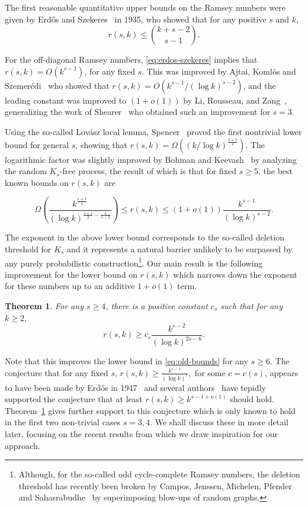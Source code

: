 \documentclass{article}
\theoremstyle{plain}
\newtheorem{theorem}{Theorem}[section]
\theoremstyle{definition}
\begin{document}
The first reasonable quantitative upper bounds on the Ramsey numbers were given by Erd\H{o}s and Szekeres~\cite{erdos-szekeres} in 1935, who showed that for any positive $s$ and $k$, 
\begin{equation} \label{eq:erdos-szekeres}
    r(s, k) \le \binom{k+s-2}{s-1}.
\end{equation}

For the off-diagonal Ramsey numbers, \eqref{eq:erdos-szekeres} implies that $r(s, k) = O(k^{s-1})$, for any fixed $s$. This was improved by Ajtai, Koml\'{o}s and Szemer\'{e}di~\cite{ajtai} who showed that $r(s, k) = O(k^{s-1} / (\log k)^{s-2})$, and the leading constant was improved to $(1+o(1))$ by Li, Rousseau, and Zang~\cite{li-rousseau-zang}, generalizing the work of Shearer~\cite{shearer} who obtained such an improvement for $s=3$.

Using the so-called Lov\'{a}sz local lemma, Spencer~\cite{spencer75, spencer77} proved the first nontrivial lower bound for general $s$, showing that $r(s, k) = \Omega\left((k / \log k)^{\frac{s+1}{2}}\right).$ The logarithmic factor was slightly improved by Bohman and Keevash~\cite{bohman-keevash-Ks} by analyzing the random $K_s$-free process, the result of which is that for fixed $s \ge 5$, the best known bounds on $r(s, k)$ are

\begin{equation} \label{eq:old-bounds}
    \Omega\left(\frac{k^{\frac{s+1}{2}}}{(\log k)^{\frac{s+1}{2} - \frac{1}{s-2}}} \right) \le r(s, k) \le (1 + o(1))\frac{k^{s-1}}{(\log k)^{s-2}}.
\end{equation} 

The exponent in the above lower bound corresponds to the so-called deletion threshold for $K_s$ and it represents a natural barrier unlikely to be surpassed by any purely probabilistic construction\footnote{Although, for the so-called odd cycle-complete Ramsey numbers, the deletion threshold has recently been broken by Campos, Jenssen, Michelen, Pfender and Sahasrabudhe~\cite{oddcyclecomplete} by superimposing blow-ups of random graphs.}. Our main result is the following improvement for the lower bound on $r(s, k)$ which narrows down the exponent for these numbers up to an additive $1 + o(1)$ term.

\begin{theorem} \label{thm:main}
    For any $s \ge 4$, there is a positive constant $c_s$ such that for any $k \ge 2,$
    \[ r(s, k) \ge c_s \frac{k^{s-2}}{(\log k)^{2s-6}}. \]
\end{theorem}
Note that this improves the lower bound in \eqref{eq:old-bounds} for any $s \ge 6$. The conjecture that for any fixed $s$, $r(s, k) \ge \frac{k^{s-1}}{(\log k)^c},$ for some $c = c(s)$, appears to have been made by Erd\H{o}s in 1947~\cite{chung-graham} and several authors~\cite{spencer77, mubayi-verstraete, CMMV-zarankiewicz} have tepidly supported the conjecture that at least $r(s, k) \ge k^{s-1+o(1)}$ should hold. Theorem~\ref{thm:main} gives further support to this conjecture which is only known to hold in the first two non-trivial cases $s = 3,4$. We shall discuss these in more detail later, focusing on the recent results from which we draw inspiration for our approach.
\end{document}
